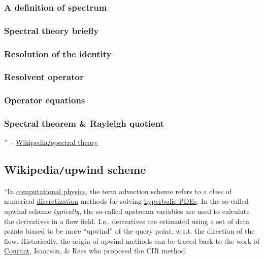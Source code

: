 \documentclass{article}
\begin{document}
\subsubsection{A definition of spectrum}

\subsubsection{Spectral theory briefly}

\subsubsection{Resolution of the identity}

\subsubsection{Resolvent operator}

\subsubsection{Operator equations}

\subsubsection{Spectral theorem \& Rayleigh quotient}

'' -- \href{https://en.wikipedia.org/wiki/Spectral_theory}{Wikipedia{\tt/}spectral theory}


\subsection{Wikipedia{\tt/}upwind scheme}
``In \href{https://en.wikipedia.org/wiki/Computational_physics}{computational physics}, the term advection scheme refers to a class of numerical \href{https://en.wikipedia.org/wiki/Discretization}{discretization} methods for solving \href{https://en.wikipedia.org/wiki/Hyperbolic_partial_differential_equation}{hyperbolic PDEs}. In the so-called upwind scheme {\it typically}, the so-called upstream variables are used to calculate the derivatives in a flow field. I.e., derivatives are estimated using a set of data points biased to be more ``upwind'' of the query point, w.r.t. the direction of the flow. Historically, the origin of upwind methods can be traced back to the work of \href{https://en.wikipedia.org/wiki/Richard_Courant}{\sc Courant}, {\sc Isaacson}, \& {\sc Rees} who proposed the CIR method.
\end{document}
